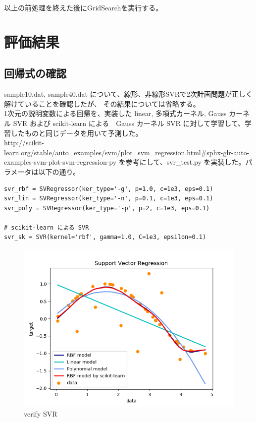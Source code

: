 \documentclass{jsarticle}
\begin{document}
以上の前処理を終えた後にGridSearchを実行する。

\section{評価結果}
\subsection{回帰式の確認}
sample10.dat, sample40.dat について、線形、非線形SVRで2次計画問題が正しく解けていることを確認したが、
その結果については省略する。 \\
1次元の説明変数による回帰を、実装した linear, 多項式カーネル, Gauss カーネル SVR および scikit-learn による　Gauss カーネル SVR
に対して学習して、学習したものと同じデータを用いて予測した。 \\
http://scikit-learn.org/stable/auto\_examples/svm/plot\_svm\_regression.html\#sphx-glr-auto-examples-svm-plot-svm-regression-py
を参考にして、svr\_test.py を実装した。パラメータは以下の通り。
\begin{lstlisting}
svr_rbf = SVRegressor(ker_type='-g', p=1.0, c=1e3, eps=0.1)
svr_lin = SVRegressor(ker_type='-n', p=0.1, c=1e3, eps=0.1)
svr_poly = SVRegressor(ker_type='-p', p=2, c=1e3, eps=0.1)

# scikit-learn による SVR
svr_sk = SVR(kernel='rbf', gamma=1.0, C=1e3, epsilon=0.1)
\end{lstlisting}
\begin{figure}[!h]
\includegraphics[width=15cm]{svr_verify.png}
\caption{verify SVR}
\end{figure}
\end{document}
